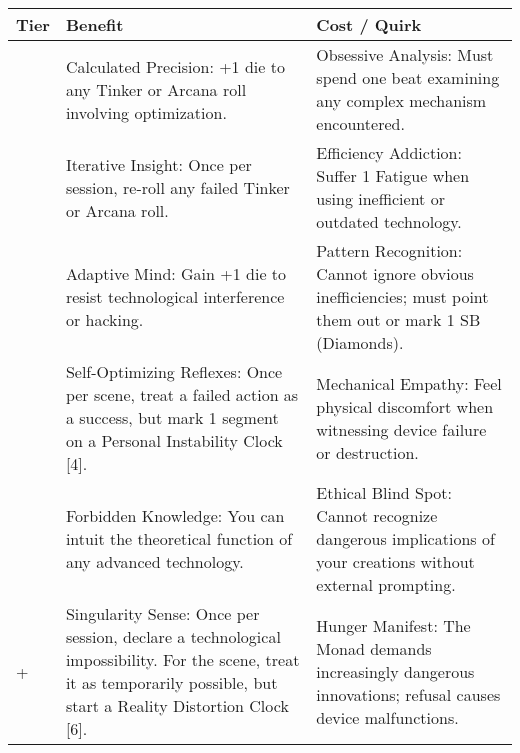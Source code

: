 \begin{longtable}{>{\raggedright\arraybackslash}p{1cm} p{5cm} p{5cm}}
\toprule
\textbf{Tier} & \textbf{Benefit} & \textbf{Cost / Quirk} \\
\midrule
1 & Calculated Precision: +1 die to any Tinker or Arcana roll involving optimization. & Obsessive Analysis: Must spend one beat examining any complex mechanism encountered. \\
\midrule
2 & Iterative Insight: Once per session, re-roll any failed Tinker or Arcana roll. & Efficiency Addiction: Suffer 1 Fatigue when using inefficient or outdated technology. \\
\midrule
3 & Adaptive Mind: Gain +1 die to resist technological interference or hacking. & Pattern Recognition: Cannot ignore obvious inefficiencies; must point them out or mark 1 SB (Diamonds). \\
\midrule
4 & Self-Optimizing Reflexes: Once per scene, treat a failed action as a success, but mark 1 segment on a Personal Instability Clock [4]. & Mechanical Empathy: Feel physical discomfort when witnessing device failure or destruction. \\
\midrule
5 & Forbidden Knowledge: You can intuit the theoretical function of any advanced technology. & Ethical Blind Spot: Cannot recognize dangerous implications of your creations without external prompting. \\
\midrule
6+ & Singularity Sense: Once per session, declare a technological impossibility. For the scene, treat it as temporarily possible, but start a Reality Distortion Clock [6]. & Hunger Manifest: The Monad demands increasingly dangerous innovations; refusal causes device malfunctions. \\
\bottomrule
\end{longtable}